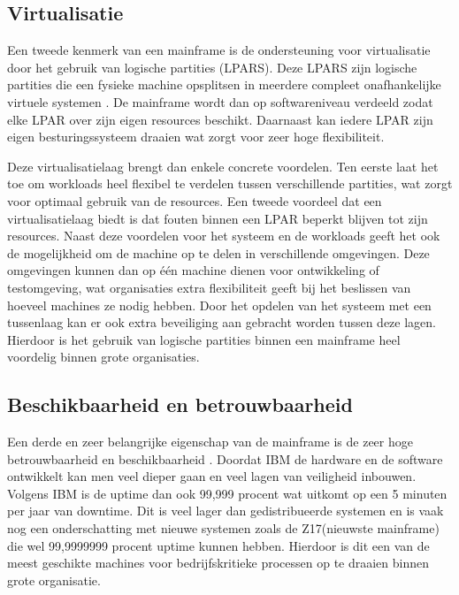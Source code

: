\subsection{Virtualisatie}%
\label{sec:virtualisatie-mainframe}

Een tweede kenmerk van een mainframe is de ondersteuning voor virtualisatie door het gebruik van logische partities (LPARS).
Deze LPARS zijn logische partities die een fysieke machine opsplitsen in meerdere compleet onafhankelijke virtuele systemen \autocite{buecker2016security}.
De mainframe wordt dan op softwareniveau verdeeld zodat elke LPAR over zijn eigen resources beschikt.
Daarnaast kan iedere LPAR zijn eigen besturingssysteem draaien wat zorgt voor zeer hoge flexibiliteit.

Deze virtualisatielaag brengt dan enkele concrete voordelen.
Ten eerste laat het toe om workloads heel flexibel te verdelen tussen verschillende partities, wat zorgt voor optimaal gebruik van de resources.
Een tweede voordeel dat een virtualisatielaag biedt is dat fouten binnen een LPAR beperkt blijven tot zijn resources.
Naast deze voordelen voor het systeem en de workloads geeft het ook de mogelijkheid om de machine op te delen in verschillende omgevingen.
Deze omgevingen kunnen dan op één machine dienen voor ontwikkeling of testomgeving, wat organisaties extra flexibiliteit geeft bij het beslissen van hoeveel machines ze nodig hebben.
Door het opdelen van het systeem met een tussenlaag kan er ook extra beveiliging aan gebracht worden tussen deze lagen.
Hierdoor is het gebruik van logische partities binnen een mainframe heel voordelig binnen grote organisaties.

\subsection{Beschikbaarheid en betrouwbaarheid}%
\label{sec:beschikbaarheid-mainframe}

Een derde en zeer belangrijke eigenschap van de mainframe is de zeer hoge betrouwbaarheid en beschikbaarheid \autocite{raju2024ras}.
Doordat IBM de hardware en de software ontwikkelt kan men veel dieper gaan en veel lagen van veiligheid inbouwen.
Volgens IBM is de uptime dan ook 99,999 procent wat uitkomt op een 5 minuten per jaar van downtime.
Dit is veel lager dan gedistribueerde systemen en is vaak nog een onderschatting met nieuwe systemen zoals de Z17(nieuwste mainframe) die wel 99,9999999 procent uptime kunnen hebben.
Hierdoor is dit een van de meest geschikte machines voor bedrijfskritieke processen op te draaien binnen grote organisatie.

